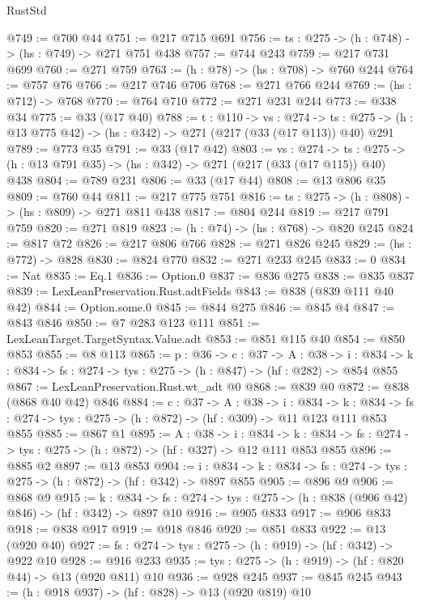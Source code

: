 \begin{lexlean}{RustStd}
\begin{coremodule}
@749 := @700 @44
@751 := @217 @715 @691
@756 := {ts : @275} -> (h : @748) -> (hs : @749) -> @271 @751 @438
@757 := @744 @243
@759 := @217 @731 @699
@760 := @271 @759
@763 := (h : @78) -> (hs : @708) -> @760 @244
@764 := @757 @76
@766 := @217 @746 @706
@768 := @271 @766 @244
@769 := (hs : @712) -> @768
@770 := @764 @710
@772 := @271 @231 @244
@773 := @338 @34
@775 := @33 (@17 @40)
@788 := {t : @110} ->
  {vs : @274} ->
  {ts : @275} -> (h : @13 @775 @42) -> (hs : @342) -> @271 (@217 (@33 (@17 @113)) @40) @291
@789 := @773 @35
@791 := @33 (@17 @42)
@803 := {vs : @274} ->
  {ts : @275} -> (h : @13 @791 @35) -> (hs : @342) -> @271 (@217 (@33 (@17 @115)) @40) @438
@804 := @789 @231
@806 := @33 (@17 @44)
@808 := @13 @806 @35
@809 := @760 @44
@811 := @217 @775 @751
@816 := {ts : @275} -> (h : @808) -> (hs : @809) -> @271 @811 @438
@817 := @804 @244
@819 := @217 @791 @759
@820 := @271 @819
@823 := (h : @74) -> (hs : @768) -> @820 @245
@824 := @817 @72
@826 := @217 @806 @766
@828 := @271 @826 @245
@829 := (hs : @772) -> @828
@830 := @824 @770
@832 := @271 @233 @245
@833 := 0
@834 := Nat
@835 := Eq.{1}
@836 := Option.{0}
@837 := @836 @275
@838 := @835 @837
@839 := LexLeanPreservation.Rust.adtFields
@843 := @838 (@839 @111 @40 @42)
@844 := Option.some.{0}
@845 := @844 @275
@846 := @845 @4
@847 := @843 @846
@850 := @7 @283 @123 @111
@851 := LexLeanTarget.TargetSyntax.Value.adt
@853 := @851 @115 @40
@854 := @850 @853
@855 := @8 @113
@865 := {p : @36} ->
  {c : @37} ->
  {A : @38} ->
  {i : @834} -> {k : @834} -> {fs : @274} -> {tys : @275} -> (h : @847) -> (hf : @282) -> @854 @855
@867 := LexLeanPreservation.Rust.wt_adt @0
@868 := @839 @0
@872 := @838 (@868 @40 @42) @846
@884 := {c : @37} ->
  {A : @38} ->
  {i : @834} ->
  {k : @834} -> {fs : @274} -> {tys : @275} -> (h : @872) -> (hf : @309) -> @11 @123 @111 @853 @855
@885 := @867 @1
@895 := {A : @38} ->
  {i : @834} ->
  {k : @834} -> {fs : @274} -> {tys : @275} -> (h : @872) -> (hf : @327) -> @12 @111 @853 @855
@896 := @885 @2
@897 := @13 @853
@904 := {i : @834} ->
  {k : @834} -> {fs : @274} -> {tys : @275} -> (h : @872) -> (hf : @342) -> @897 @855
@905 := @896 @9
@906 := @868 @9
@915 := {k : @834} ->
  {fs : @274} -> {tys : @275} -> (h : @838 (@906 @42) @846) -> (hf : @342) -> @897 @10
@916 := @905 @833
@917 := @906 @833
@918 := @838 @917
@919 := @918 @846
@920 := @851 @833
@922 := @13 (@920 @40)
@927 := {fs : @274} -> {tys : @275} -> (h : @919) -> (hf : @342) -> @922 @10
@928 := @916 @233
@935 := {tys : @275} -> (h : @919) -> (hf : @820 @44) -> @13 (@920 @811) @10
@936 := @928 @245
@937 := @845 @245
@943 := (h : @918 @937) -> (hf : @828) -> @13 (@920 @819) @10

\end{coremodule}
\end{lexlean}
